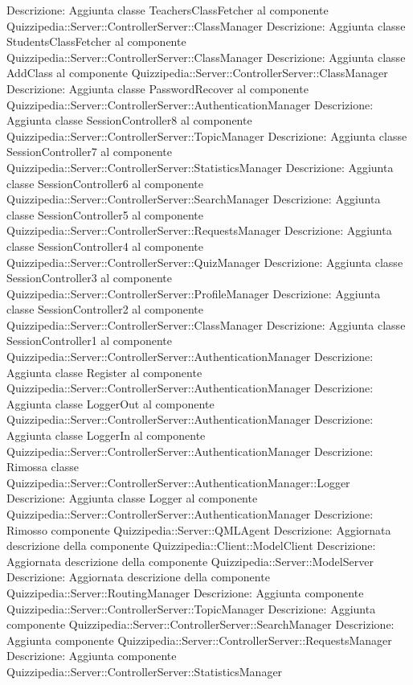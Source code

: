 Descrizione: Aggiunta classe TeachersClassFetcher al componente Quizzipedia::Server::ControllerServer::ClassManager 
Descrizione: Aggiunta classe StudentsClassFetcher al componente Quizzipedia::Server::ControllerServer::ClassManager 
Descrizione: Aggiunta classe AddClass al componente Quizzipedia::Server::ControllerServer::ClassManager 
Descrizione: Aggiunta classe PasswordRecover al componente Quizzipedia::Server::ControllerServer::AuthenticationManager 
Descrizione: Aggiunta classe SessionController8 al componente Quizzipedia::Server::ControllerServer::TopicManager 
Descrizione: Aggiunta classe SessionController7 al componente Quizzipedia::Server::ControllerServer::StatisticsManager 
Descrizione: Aggiunta classe SessionController6 al componente Quizzipedia::Server::ControllerServer::SearchManager 
Descrizione: Aggiunta classe SessionController5 al componente Quizzipedia::Server::ControllerServer::RequestsManager 
Descrizione: Aggiunta classe SessionController4 al componente Quizzipedia::Server::ControllerServer::QuizManager 
Descrizione: Aggiunta classe SessionController3 al componente Quizzipedia::Server::ControllerServer::ProfileManager 
Descrizione: Aggiunta classe SessionController2 al componente Quizzipedia::Server::ControllerServer::ClassManager 
Descrizione: Aggiunta classe SessionController1 al componente Quizzipedia::Server::ControllerServer::AuthenticationManager 
Descrizione: Aggiunta classe Register al componente Quizzipedia::Server::ControllerServer::AuthenticationManager 
Descrizione: Aggiunta classe LoggerOut al componente Quizzipedia::Server::ControllerServer::AuthenticationManager 
Descrizione: Aggiunta classe LoggerIn al componente Quizzipedia::Server::ControllerServer::AuthenticationManager 
Descrizione: Rimossa classe Quizzipedia::Server::ControllerServer::AuthenticationManager::Logger 
Descrizione: Aggiunta classe Logger al componente Quizzipedia::Server::ControllerServer::AuthenticationManager 
Descrizione: Rimosso componente Quizzipedia::Server::QMLAgent 
Descrizione: Aggiornata descrizione della componente Quizzipedia::Client::ModelClient 
Descrizione: Aggiornata descrizione della componente Quizzipedia::Server::ModelServer 
Descrizione: Aggiornata descrizione della componente Quizzipedia::Server::RoutingManager 
Descrizione: Aggiunta componente Quizzipedia::Server::ControllerServer::TopicManager 
Descrizione: Aggiunta componente Quizzipedia::Server::ControllerServer::SearchManager 
Descrizione: Aggiunta componente Quizzipedia::Server::ControllerServer::RequestsManager 
Descrizione: Aggiunta componente Quizzipedia::Server::ControllerServer::StatisticsManager 
